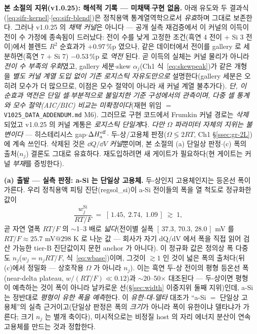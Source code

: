 \begin{warnbox}
\textbf{본 소절의 지위(v1.0.25): 해석적 기록 --- 미채택$\cdot$구현 없음.} 아래 유도와 두 결과식
(\eqref{eq:sifr-kernel}$\cdot$\eqref{eq:sifr-blend})은 정칙용액 통계열역학으로서 \emph{유효}하며 그대로
보존한다. 그러나 v1.0.25 의 \emph{채택 커널}은 아니다 --- 공개 실측 재검증에서 이 커널의 이득이 전이 수
가정에 종속됨이 드러났다: 전이 수를 낮게 고정한 조건(흑연 4 전이 $+$ Si 3 전이)에서 블렌드 $R^2$ 순효과가
$+0.97$\,\%p 였으나, 같은 데이터에서 전이를 gallery 로 세분하면(흑연 7 $+$ Si 7) $-0.53$\,\%p 로 \emph{역전}
된다. 곧 이득의 실체는 커널 물리가 아니라 \emph{전이 수 부족의 우회}였고, gallery 세분$\cdot$skew
$\alpha_j$(Ch1 식~\eqref{eq:skewpeak})가 같은 개형을 \emph{별도 커널 계열 도입 없이 기존 로지스틱
자유도만으로} 설명한다(gallery 세분은 오히려 모수가 더 많으므로, 이점은 모수 절약이 아니라 새 커널
계열 불추가다). \emph{단, 이 순효과 역전은 단일 셀$\cdot$부분적으로 불일치한 기준 구성에서의 관측이며,
다중 셀 통계와 모수 절약(AIC/BIC) 비교는 미확정이다}(재현 위임 $=$ \texttt{V1025\_DATA\_ADDENDUM.md} M6).
그러므로 구현 코드에서
Frumkin 커널 경로는 \emph{삭제}되었고 v1.0.25 의 커널 계통은 \emph{로지스틱 단일계}다.
\emph{다만 $\Omega$ 파라미터 자체의 지위는 불변이다} --- 히스테리시스 gap$\cdot$$\Delta H_a^{\mathrm{eff}}$$\cdot$
두-상/고용체 판정($\Omega\lessgtr2RT$, Ch1 \S\ref{ssec:gr-2L})에 계속 쓰인다. 삭제된 것은 $\dd Q/\dd V$
\emph{커널}뿐이며, 본 소절의 (a) 단일상 판정$\cdot$(c) 폭의 출처($n_j$) 결론도 그대로 유효하다.
재도입하려면 새 게이트가 필요하다(현 게이트는 커널 \emph{부재}를 증빙한다).
\end{warnbox}

\textbf{(a) 출발 --- 실측 판정: a-Si 는 단일상 고용체.} 두-상인지 고용체인지는 등온선 폭이 가른다. 우리 정칙용액
피팅 진단(regsol\_si)이 a-Si 전이들의 폭을 열 척도로 정규화한 값이
\begin{equation}
\frac{w_j^{\mathrm{Si}}}{RT/F}\;=\;[\,1.45,\;2.74,\;1.09\,]\;\gtrsim\;1,
\label{eq:sifr-width}
\end{equation}
곧 자연 열폭 $RT/F$ 의 $\sim$1--3 배로 \emph{넓다}(전이별 실폭 $[\,37.3,\,70.3,\,28.0\,]$ mV 를
$RT/F\!\approx\!25.7$ mV$@298$ K 로 나눈 값 --- 회사가 자기 dQ/dV 에서 폭을 직접 읽어 검산 가능한
tier-B 진단값이지 문헌 anchor 가 아니다). 이 정규화 값은 정의상 폭 다중도 $n_j$($w_j{=}n_jRT/F$,
식~\eqref{eq:wbase})이며, 그것이 $\gtrsim1$ 인 것이 넓은 폭의 출처다(뒤 (c)에서 정밀화 --- 상호작용 $\Omega$ 가
아니라 $n_j$). 이는 흑연 두-상 전이의 평형 등온선 폭(near-delta plateau, $w/(RT/F)\!\ll\!0.12$)과 $\sim$20--50$\times$
대조된다 --- 두-상이면 평형이 예측하는 것이 폭이 아니라 날카로운 선(\S\ref{sec:width} 이중지위 둘째 지위)인데,
a-Si 는 정반대로 \emph{평형이 유한 폭을 예측}한다. 이 \emph{유한-대-델타} 대조가 ``a-Si $=$ 단일상 고용체''의
실측 근거이고(단일상 판정은 폭의 \emph{크기}가 아니라 폭이 유한이냐 델타냐가 가른다; 크기 $n_j$ 는 별개 축이다),
미시적으로는 비정질 host 의 자리 에너지 분산이 연속 고용체를 만드는 것과 정합한다\cite{chevrier_dahn2009,artrith2018}.

